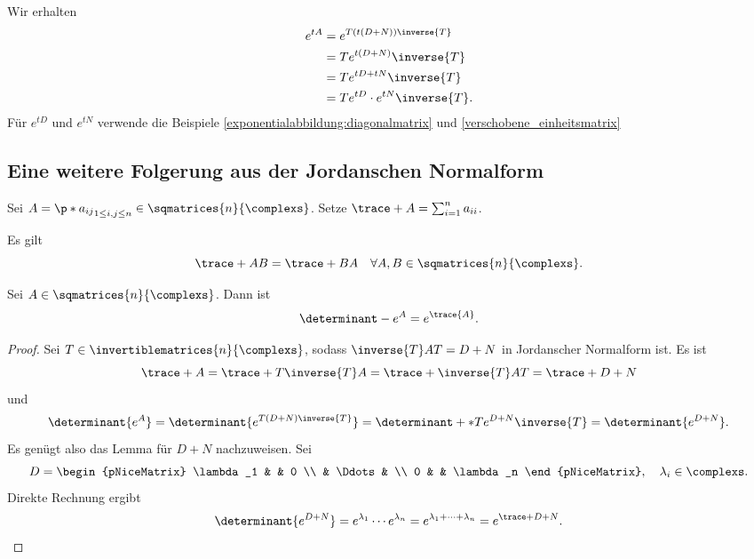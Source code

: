 Wir erhalten
\begin{align*}
  e^{tA}&=e^{T(t(D+N))\inverse{T}}\\
  &=Te^{t(D+N)}\inverse{T}\\
  &=Te^{tD+tN}\inverse{T}\\
  &=T e^{tD}\cdot e^{tN}\inverse{T}.
\end{align*}
Für \( e^{tD} \) und \( e^{tN} \) verwende die Beispiele \ref{exponentialabbildung:diagonalmatrix} und \ref{verschobene_einheitsmatrix} 

\subsection*{Eine weitere Folgerung aus der Jordanschen Normalform}

\begin{definition*}
  Sei \( A=\p*{a_{ij}}_{1\leq i,j\leq n}\in \sqmatrices{n}{\complexs} \). Setze \( \trace+{A}=\sum_{i=1}^{n}a_{ii} \).
\end{definition*}
\begin{bemerkung*}
  Es gilt
  \begin{equation*}
    \trace+{AB}=\trace+{BA}\quad \forall A,B\in \sqmatrices{n}{\complexs}.
  \end{equation*}
\end{bemerkung*}
\begin{lemma}
  Sei \( A\in \sqmatrices{n}{\complexs} \). Dann ist
  \begin{equation*}
    \determinant-{e^A}=e^{\trace{A}}.
  \end{equation*}
\end{lemma}
\begin{proof}
  Sei \( T\in \invertiblematrices{n}{\complexs} \), sodass \( \inverse{T}AT=D+N \) in Jordanscher Normalform ist. Es ist
  \begin{equation*}
    \trace+{A}=\trace+{T\inverse{T} A}=\trace+{\inverse{T}AT}=\trace+{D+N}
  \end{equation*}
  und 
  \begin{equation*}
    \determinant{e^A}=\determinant{e^{T(D+N)\inverse{T}}}=\determinant+*{Te^{D+N}\inverse{T}}=\determinant{e^{D+N}}.
  \end{equation*}
  Es genügt also das Lemma für \( D+N \) nachzuweisen. Sei
  \begin{equation*}
    D=\begin{pNiceMatrix} \lambda_1 &  & 0 \\  & \Ddots &  \\ 0 &  & \lambda_n \end{pNiceMatrix}, \quad \lambda_i\in \complexs.
  \end{equation*}
  Direkte Rechnung ergibt 
  \begin{equation*}
    \determinant{e^{D+N}}=e^{\lambda_1}\dotsm e^{\lambda_n}=e^{\lambda_1+\dotsb+\lambda_n}=e^{\trace+{D+N}}.
  \end{equation*}
\end{proof}
